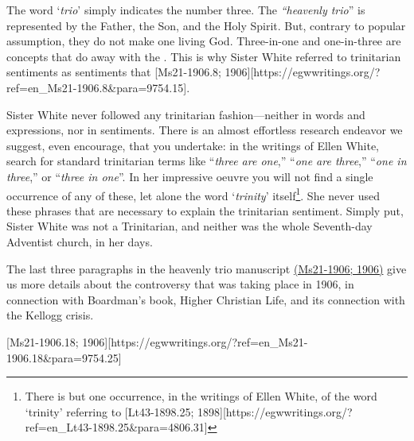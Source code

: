 The word ‘\textit{trio}’ simply indicates the number three. The \textit{“heavenly trio}” is represented by the Father, the Son, and the Holy Spirit. But, contrary to popular assumption, they do not make one living God. Three-in-one and one-in-three are concepts that do away with the . This is why Sister White referred to trinitarian sentiments as sentiments that [Ms21-1906.8; 1906][https://egwwritings.org/?ref=en\_Ms21-1906.8&para=9754.15].

Sister White never followed any trinitarian fashion—neither in words and expressions, nor in sentiments. There is an almost effortless research endeavor we suggest, even encourage, that you undertake: in the writings of Ellen White, search for standard trinitarian terms like “\textit{three are one},” “\textit{one are three},” “\textit{one in three},” or “\textit{three in one}”. In her impressive oeuvre you will not find a single occurrence of any of these, let alone the word ‘\textit{trinity}’ itself\footnote{There is but one occurrence, in the writings of Ellen White, of the word ‘trinity’ referring to [Lt43-1898.25; 1898][https://egwwritings.org/?ref=en_Lt43-1898.25&para=4806.31]}. She never used these phrases that are necessary to explain the trinitarian sentiment. Simply put, Sister White was not a Trinitarian, and neither was the whole Seventh-day Adventist church, in her days.

The last three paragraphs in the heavenly trio manuscript \href{https://egwwritings.org/?ref=en_Ms21-1906&para=9754.1}{(Ms21-1906; 1906)} give us more details about the controversy that was taking place in 1906, in connection with Boardman’s book, Higher Christian Life, and its connection with the Kellogg crisis.

[Ms21-1906.18; 1906][https://egwwritings.org/?ref=en\_Ms21-1906.18&para=9754.25]

